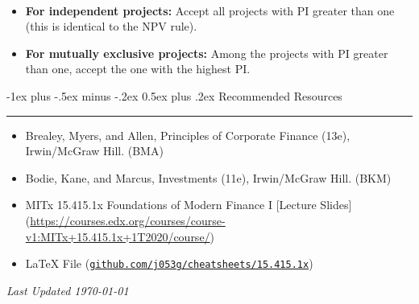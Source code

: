 \documentclass[10pt,landscape,a4paper]{article}
\makeatletter
\renewcommand{\section}{\@startsection{section}{1}{0mm}%
                                {-1ex plus -.5ex minus -.2ex}%
                                {0.5ex plus .2ex}%
                                {\normalfont\large\bfseries}}
\makeatother
\begin{document}
\begin{multicols*}{3}
\begin{description}[itemsep=0pt]
	\item[Decision Criterion Using PI]  ~
	\begin{itemize}
		\item {\bf For independent projects:} Accept all projects with PI greater than one (this
		is identical to the NPV rule).
		\item {\bf For mutually exclusive projects: } Among the projects with PI greater than
		one, accept the one with the highest PI.
		
	\end{itemize}
\end{description}

\newpage

\section{Recommended Resources} \smallskip \hrule height 1pt \smallskip

\bigskip

\begin{itemize}
\item Brealey, Myers, and Allen, Principles of Corporate Finance (13e), Irwin/McGraw Hill. (BMA)
\item Bodie, Kane, and Marcus, Investments (11e), Irwin/McGraw Hill. (BKM)
\item MITx 15.415.1x Foundations of Modern Finance I [Lecture Slides] (\url{https://courses.edx.org/courses/course-v1:MITx+15.415.1x+1T2020/course/})
\item LaTeX File (\texttt{\href{https://github.com/j053g/cheatsheets/blob/main/15.415.1x/15.415.1x_finance_1.tex}{github.com/j053g/cheatsheets/15.415.1x}})
\end{itemize}

\begin{center}
	\emph{Last Updated \today}
\end{center}

\end{multicols*}
\end{document}

